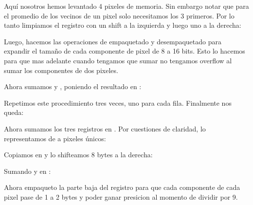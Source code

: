 Aquí nosotros hemos levantado 4 pixeles de memoria. Sin embargo notar que para el promedio de los vecinos de un pixel solo necesitamos los 3 primeros. Por lo tanto limpiamos el registro  con un shift a la izquierda y luego uno a la derecha:


Luego, hacemos las operaciones de empaquetado y desempaquetado para expandir el tamaño de cada componente de pixel de 8 a 16 bits. Esto lo hacemos para que mas adelante cuando tengamos que sumar no tengamos overflow al sumar los componentes de dos pixeles.



Ahora sumamos  y , poniendo el resultado en :


Repetimos este procedimiento tres veces, uno para cada fila. Finalmente nos queda:




Ahora sumamos los tres registros en . Por cuestiones de claridad, lo representamos de a pixeles únicos:


Copiamos  en  y lo shifteamos 8 bytes a la derecha:


Sumando  y  en :


Ahora empaqueto la parte baja del registro para que cada componente de cada pixel pase de 1 a 2 bytes y poder ganar presicion al momento de dividir por 9.


